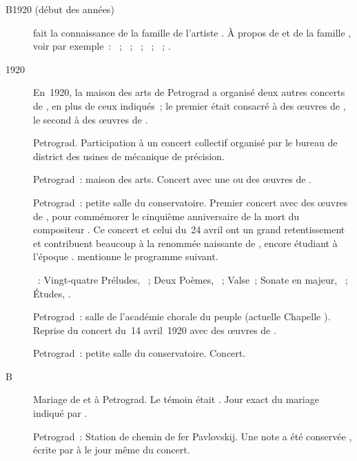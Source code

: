 \begin{description}
 \item[B1920 (début des années)]
 \VSofronitsky{} fait la connaissance de la famille de l'artiste \EVizel{}
 \citep[voir][p.~144]{Nekrasova08}.
 À propos de \Sofronitsky{} et de la famille \Vizel{}, voir par exemple~:
 \citet{Gorohovsky}~; \citet{Lobacheva03}~; \citet{Vizel03}~;
 \citet{Vizel13a}~; \citet{Vizel13b}~; \citet{Vizel13c}.
 \item[1920]
 En~1920, la maison des arts de Petrograd a organisé deux autres concerts de
 \VSofronitsky{}, en plus de ceux indiqués~; le premier était consacré à des
 œuvres de \Liszt{}, le second à des œuvres de \Schumann{}.
 \item[]
 Petrograd.
 Participation à un concert collectif organisé par le bureau de district des
 usines de mécanique de précision.
 \item[]
 Petrograd~: maison des arts.
 Concert avec une ou des œuvres de \Schumann{}.
 \item[]
 Petrograd~: petite salle du conservatoire.
 Premier concert avec des œuvres de \Scriabine{}, pour commémorer le
 cinquième anniversaire de la mort du compositeur
 \citep[voir][p.~142]{Nekrasova08}.
 Ce concert et celui du~24 avril ont un grand retentissement et contribuent
 beaucoup à la renommée naissante de \VSofronitsky{}, encore étudiant à
 l'époque \citep[voir][]{Bogdanov67a}.
 \citet[p.~8]{Artese} mentionne le programme suivant.

 \textsc{\Scriabine{}}~: Vingt-quatre Préludes, ~; Deux Poèmes,
 ~; Valse~; Sonate  en \kF \Sharp majeur, ~;
 Études, .
 \item[]
 Petrograd~: salle de l'académie chorale du peuple (actuelle Chapelle
 \Glinka{}).
 Reprise du concert du~14 avril~1920 avec des œuvres de \Scriabine{}.
 \item[]
 Petrograd~: petite salle du conservatoire.
 Concert.
 \item[B]
 Mariage de \VSofronitsky{} et \EScriabina{} à Petrograd.
 Le témoin était \AGlazounov{}.
 Jour exact du mariage indiqué par \RKoganSofronitskaya{}
 \citep[voir][p.~87]{Artese}.
 \item[]
 Petrograd~: Station de chemin de fer Pavlovskij.
 Une note a été conservée \citep[voir][p.~142]{Nekrasova08}, écrite par
 \VSofronitsky{} à \LNikolaiev{} le jour même du concert.


\end{description}
